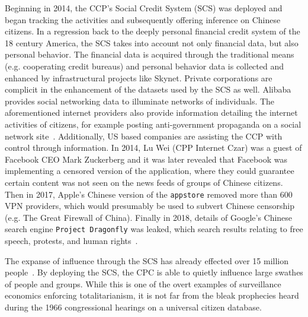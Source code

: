 Beginning in 2014, the CCP's Social Credit System (SCS) was deployed and began
tracking the activities and subsequently offering inference on Chinese
citizens. In a regression back to the deeply personal financial credit system
of the 18 century America, the SCS takes into account not only financial
data, but also personal behavior. The financial data is acquired through the
traditional means (e.g. cooperating credit bureaus) and personal behavior data
is collected and enhanced by infrastructural projects like Skynet. Private
corporations are complicit in the enhancement of the datasets used by the SCS
as well. Alibaba provides social networking data to illuminate networks of
individuals. The aforementioned internet providers also provide information
detailing the internet activities of citizens, for example posting
anti-government propaganda on a social network site~\cite{qiang2019road}.
Additionally, US based companies are assisting the CCP with control through
information. In 2014, Lu Wei (CPP Internet Czar) was a guest of Facebook CEO
Mark Zuckerberg and it was later revealed that Facebook was implementing a
censored version of the application, where they could guarantee certain content
was not seen on the news feeds of groups of Chinese citizens. Then in 2017,
Apple's Chinese version of the \texttt{appstore} removed more than 600 VPN
providers, which would presumably be used to subvert Chinese censorship (e.g.
The Great Firewall of China). Finally in 2018, details of Google's Chinese
search engine \texttt{Project Dragonfly} was leaked, which search results
relating to free speech, protests, and human rights~\cite{qiang2019road}.

The expanse of influence through the SCS has already effected over 15 million
people~\cite{qiang2019road}. By deploying the SCS, the CPC is able to quietly
influence large swathes of people and groups. While this is one of the overt
examples of surveillance economics enforcing totalitarianism, it is not far
from the bleak prophecies heard during the 1966 congressional hearings on a
universal citizen database.



%
%
%
